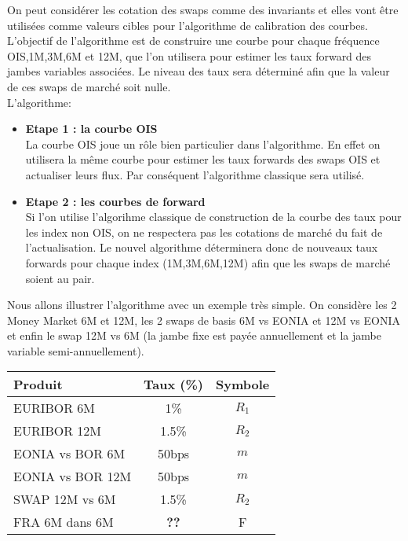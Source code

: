 \documentclass{article}
\begin{document}
On peut considérer les cotation des swaps comme des invariants et elles vont être utilisées comme valeurs cibles pour l'algorithme de calibration des courbes. L'objectif de l'algorithme est de construire une courbe pour chaque fréquence OIS,1M,3M,6M et 12M, que l'on utilisera pour estimer les taux forward des jambes variables associées. Le niveau des taux sera déterminé afin que la valeur de ces swaps de marché soit nulle.\\

L'algorithme:\\
\begin{itemize}
\item \textbf{Etape 1 : la courbe OIS}\\
La courbe OIS joue un rôle bien particulier dans l'algorithme. En effet on utilisera la même courbe pour estimer les taux forwards des swaps OIS et actualiser leurs flux. Par conséquent l'algorithme classique sera utilisé.\\
\item{\textbf{Etape 2 : les courbes de forward}}\\
Si l'on utilise l'algorihme classique de construction de la courbe des taux pour les index non OIS, on ne respectera pas les cotations de marché du fait de l'actualisation. Le nouvel algorithme déterminera donc de nouveaux taux forwards pour chaque index (1M,3M,6M,12M) afin que les swaps de marché soient au pair.\\ 
\end{itemize}

Nous allons illustrer l'algorithme avec un exemple très simple. On considère les 2 Money Market 6M et 12M, les 2 swaps de basis 6M vs EONIA et 12M vs EONIA et enfin le swap 12M vs 6M (la jambe fixe est payée annuellement et la jambe variable semi-annuellement).\\
\begin{center}
\begin{tabular}{|l|c|c|}
\hline
Produit & Taux (\%) & Symbole\\
\hline
EURIBOR 6M & 1\% & $R_1$ \\
EURIBOR 12M & 1.5\% & $R_2$ \\
EONIA vs BOR 6M & 50bps & $m$\\
EONIA vs BOR 12M & 50bps & $m$\\
SWAP 12M vs 6M & 1.5\% & $R_2$ \\
FRA 6M dans 6M & \textbf{??} & F \\
\hline
\end{tabular}
\end{center}
\end{document}
